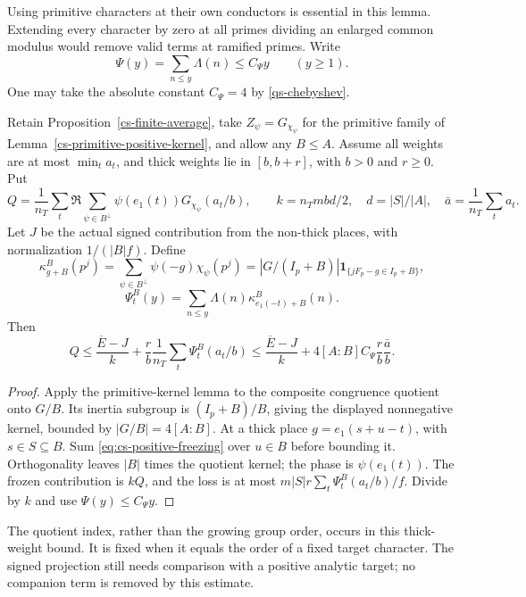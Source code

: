 Using primitive characters at their own conductors is essential in this
lemma. Extending every character by zero at all primes dividing an
enlarged common modulus would remove valid terms at ramified primes.
Write
\[
 \Psi(y)=\sum_{n\le y}\Lambda(n)\le C_\Psi y\qquad(y\ge1).
\]
One may take the absolute constant $C_\Psi=4$ by
\eqref{qs-chebyshev}.

\begin{proposition}
\label{cs-positive-quotient-transfer}
Retain Proposition~\ref{cs-finite-average}, take
$Z_\psi=G_{\chi_\psi}$ for the primitive family of
Lemma~\ref{cs-primitive-positive-kernel}, and allow any $B\le A$.
Assume all weights are at most $\min_ta_t$, and thick weights lie in
$[b,b+r]$, with $b>0$ and $r\ge0$. Put
\[
 Q=\frac1{n_T}\sum_t\Re\sum_{\psi\in B^\perp}
           \psi(e_1(t))G_{\chi_\psi}(a_t/b),\qquad
 k=n_Tmbd/2,\quad d=|S|/|A|,
 \quad\bar a=\frac1{n_T}\sum_ta_t.
\]
Let $J$ be the actual signed contribution from the non-thick places,
with normalization $1/(|B|f)$. Define
\[
 \kappa^B_{g+B}(p^j)=
  \sum_{\psi\in B^\perp}\psi(-g)\chi_\psi(p^j)
  =|G/(I_p+B)|\mathbf1_{\{jF_p-g\in I_p+B\}},
\]
\[
 \Psi^B_t(y)=\sum_{n\le y}\Lambda(n)
                  \kappa^B_{e_1(-t)+B}(n).
\]
Then
\[
 Q\le\frac{\overline E-J}{k}
        +\frac rb\frac1{n_T}\sum_t\Psi^B_t(a_t/b)
 \le\frac{\overline E-J}{k}
        +4[A:B]C_\Psi\frac rb\frac{\bar a}b.
\]
\end{proposition}
\begin{proof}
Apply the primitive-kernel lemma to the composite congruence quotient
onto $G/B$. Its inertia subgroup is $(I_p+B)/B$, giving the displayed
nonnegative kernel, bounded by $|G/B|=4[A:B]$.
At a thick place $g=e_1(s+u-t)$, with $s\in S\subseteq B$.
Sum \eqref{eq:cs-positive-freezing} over $u\in B$ before bounding
it. Orthogonality leaves $|B|$ times the quotient kernel; the phase
is $\psi(e_1(t))$. The frozen contribution is $kQ$, and the loss is
at most $m|S|r\sum_t\Psi^B_t(a_t/b)/f$. Divide by $k$ and use
$\Psi(y)\le C_\Psi y$.
\end{proof}

The quotient index, rather than the growing group order, occurs in this
thick-weight bound. It is fixed when it equals the order of a fixed
target character. The signed projection still needs comparison with a
positive analytic target; no companion term is removed by this estimate.

